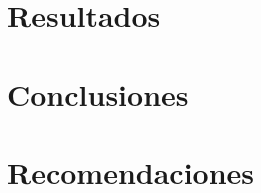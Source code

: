 \section{Resultados}
\label{section01:resulados}


\section{Conclusiones}
\label{section02:conclusiones}


\section{Recomendaciones}
\label{section03:recomendaciones}
